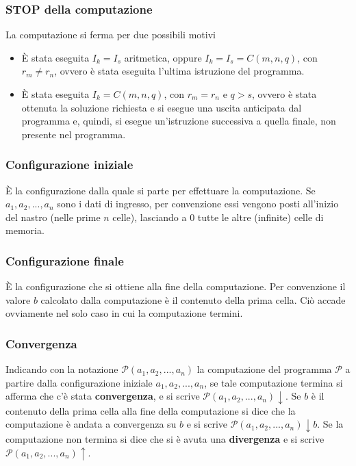 \documentclass[a4paper]{extarticle}
\begin{document}
\vspace{1em}
\subsubsection{STOP della computazione}
La computazione si ferma per due possibili motivi
\begin{itemize}
    \item È stata eseguita \(I_k = I_s\) aritmetica, oppure \(I_k = I_s = C(m, n, q)\), con \(r_m \neq r_n\), ovvero è stata eseguita l'ultima istruzione del programma.
    \item È stata eseguita \(I_k = C(m, n, q)\), con \(r_m = r_n\) e \(q > s\), ovvero è stata ottenuta la soluzione richiesta e si esegue una uscita anticipata dal programma e, quindi, si esegue un'istruzione successiva a quella finale, non presente nel programma.
\end{itemize}

\vspace{1em}
\subsubsection{Configurazione iniziale}
È la configurazione dalla quale si parte per effettuare la computazione. Se \(a_1, a_2, ..., a_n\) sono i dati di ingresso, per convenzione essi vengono posti all'inizio del nastro (nelle prime \(n\) celle), lasciando a \(0\) tutte le altre (infinite) celle di memoria.

\vspace{1em}
\subsubsection{Configurazione finale}
È la configurazione che si ottiene alla fine della computazione. Per convenzione il valore \(b\) calcolato dalla computazione è il contenuto della prima cella. Ciò accade ovviamente nel solo caso in cui la computazione termini.

\vspace{1em}
\subsubsection{Convergenza}
Indicando con la notazione \(\mathcal{P} (a_1, a_2, ..., a_n)\) la computazione del programma \(\mathcal{P}\) a partire dalla configurazione iniziale \(a_1, a_2, ..., a_n\), se tale computazione termina si afferma che c'è stata \textbf{convergenza}, e si scrive \(\mathcal{P}(a_1, a_2, ..., a_n) \downarrow\). Se \(b\) è il contenuto della prima cella alla fine della computazione si dice che la computazione è andata a convergenza su \(b\) e si scrive \(\mathcal{P}(a_1, a_2, ..., a_n) \downarrow b\). Se la computazione non termina si dice che si è avuta una \textbf{divergenza} e si scrive \(\mathcal{P}(a_1, a_2, ..., a_n) \uparrow\).
\end{document}
